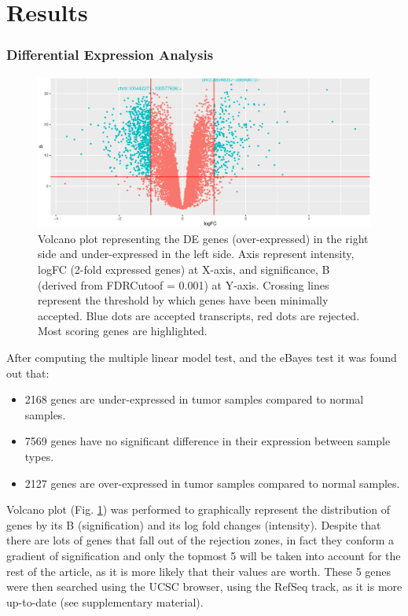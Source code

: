 \documentclass[9pt,twocolumn,twoside]{gsajnl}
\begin{document}
\section*{Results}
\subsubsection*{Differential Expression Analysis}

\begin{figure}[!h]
\centering
\includegraphics[width=\linewidth]{Volcano.eps}
\caption{Volcano plot representing the DE genes (over-expressed) in the right side and under-expressed in the left side. Axis represent intensity, logFC (2-fold expressed genes) at X-axis, and significance, B (derived from FDRCutoof = 0.001) at Y-axis. Crossing lines represent the threshold by which genes have been minimally accepted. Blue dots are accepted transcripts, red dots are rejected. Most scoring genes are highlighted.
}

\label{fig:volcano}
\end{figure}

After computing the multiple linear model test, and the eBayes test \cite{limma} 	it was found out that:

\begin{itemize}
\item 2168 genes are under-expressed in tumor samples compared to normal samples.
\item 7569 genes have no significant difference in their expression between sample types.
\item 2127 genes are over-expressed in tumor samples compared to normal samples.
\end{itemize}

Volcano plot (Fig. \ref{fig:volcano}) was performed to graphically represent the distribution of genes by its B (signification) and its log fold changes (intensity). Despite that there are lots of genes that fall out of the rejection zones, in fact they conform a gradient of signification and only the topmost 5 will be taken into account for the rest of the article, as it is more likely that their values are worth. These 5 genes were then searched using the UCSC browser, using the RefSeq track, as it is more up-to-date (see supplementary material).
\end{document}
